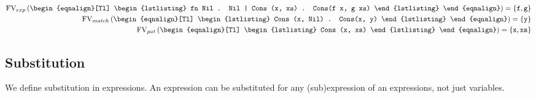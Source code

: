 \begin{example}
\label{ex:free-variables1}
\begin{eqnarray*}[c]
  \FV_{exp} \left(
    \begin{eqnalign}[Tl]
\begin{lstlisting}
fn Nil . Nil
  | Cons (x, xs) . Cons(f x, g xs)
\end{lstlisting}
    \end{eqnalign}
  \right) = \{\ttt{f}, \ttt{g} \} \\
%
  \FV_{match} \left(
    \begin{eqnalign}[Tl]
\begin{lstlisting}
Cons (x, Nil) . Cons(x, y)
\end{lstlisting}
    \end{eqnalign}
  \right) = \{\ttt{y}\} \\
%
  \FV_{pat} \left(
    \begin{eqnalign}[Tl]
\begin{lstlisting}
Cons (x, xs)
\end{lstlisting}
    \end{eqnalign}
  \right) = \{\ttt{x}, \ttt{xs}\} \\
\end{eqnarray*}
\end{example}


\subsection{Substitution}
We define substitution in expressions. An expression can be substituted for any
(sub)expression of an expressions, not just variables.


